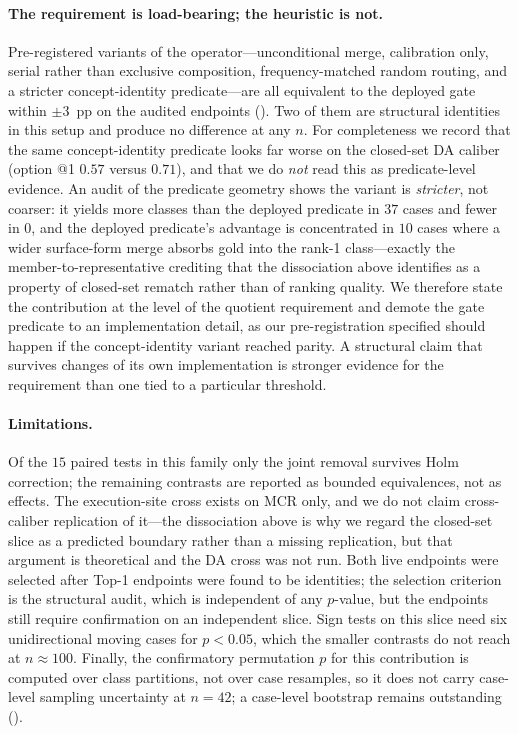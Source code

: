 \paragraph{The requirement is load-bearing; the heuristic is not.}
Pre-registered variants of the operator---unconditional merge, calibration only, serial rather than exclusive composition, frequency-matched random routing, and a stricter concept-identity predicate---are all equivalent to the deployed gate within $\pm 3$~pp on the audited endpoints ().
Two of them are structural identities in this setup and produce no difference at any $n$.
For completeness we record that the same concept-identity predicate looks far worse on the closed-set DA caliber (option @1 $0.57$ versus $0.71$), and that we do \emph{not} read this as predicate-level evidence.
An audit of the predicate geometry shows the variant is \emph{stricter}, not coarser: it yields more classes than the deployed predicate in $37$ cases and fewer in $0$, and the deployed predicate's advantage is concentrated in $10$ cases where a wider surface-form merge absorbs gold into the rank-1 class---exactly the member-to-representative crediting that the dissociation above identifies as a property of closed-set rematch rather than of ranking quality.
We therefore state the contribution at the level of the quotient requirement and demote the gate predicate to an implementation detail, as our pre-registration specified should happen if the concept-identity variant reached parity.
A structural claim that survives changes of its own implementation is stronger evidence for the requirement than one tied to a particular threshold.

\paragraph{Limitations.}
Of the $15$ paired tests in this family only the joint removal survives Holm correction; the remaining contrasts are reported as bounded equivalences, not as effects.
The execution-site cross exists on MCR only, and we do not claim cross-caliber replication of it---the dissociation above is why we regard the closed-set slice as a predicted boundary rather than a missing replication, but that argument is theoretical and the DA cross was not run.
Both live endpoints were selected after Top-1 endpoints were found to be identities; the selection criterion is the structural audit, which is independent of any $p$-value, but the endpoints still require confirmation on an independent slice.
Sign tests on this slice need six unidirectional moving cases for $p<0.05$, which the smaller contrasts do not reach at $n\approx100$.
Finally, the confirmatory permutation $p$ for this contribution is computed over class partitions, not over case resamples, so it does not carry case-level sampling uncertainty at $n{=}42$; a case-level bootstrap remains outstanding ().

